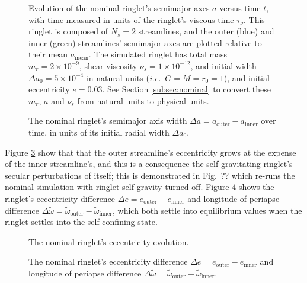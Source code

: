 \documentclass[preprint]{aastex62}
\begin{document}
\begin{figure}
\caption{Evolution of the nominal ringlet's semimajor axes $a$ versus time $t$, with time measured
in units of the ringlet's viscous time $\tau_\nu$. This ringlet is composed of $N_s=2$ streamlines,
and the outer (blue) and inner (green) streamlines' semimajor axes are plotted relative
to their mean $a_{\text{mean}}$. 
The simulated ringlet has total mass $m_r=2\times10^{-9}$, shear viscosity $\nu_s=1\times10^{-12}$,
and initial width $\Delta a_0 = 5\times10^{-4}$ in natural units ({\it i.e.}\ $G=M=r_0=1$),
and initial eccentricity $e=0.03$. See Section \ref{subsec:nominal} to convert
these $m_r$, $a$ and $\nu_s$ from natural units to physical units.
\label{fig:a_nominal}}
\end{figure}

\begin{figure}
\caption{
\label{fig:da_nominal}
The nominal ringlet's semimajor axis width $\Delta a = a_{\text{outer}} - a_{\text{inner}}$ over time, 
in units of its initial radial width $\Delta a_0$.}
\end{figure}

Figure \ref{fig:e_nominal} show that that the outer streamline's eccentricity grows at the
expense of the inner streamline's, and this is a consequence the self-gravitating ringlet's
secular perturbations of itself; this is demonstrated in Fig.\ ?? which re-runs the nominal
simulation with ringlet self-gravity turned off.  Figure \ref{fig:de_nominal} shows
the ringlet's eccentricity difference $\Delta e = e_{\text{outer}} - e_{\text{inner}}$
and longitude of periapse difference
$\Delta\tilde{\omega} = \tilde{\omega}_{\text{outer}} - \tilde{\omega}_{\text{inner}}$,
which both settle into equilibrium values when the ringlet settles into the self-confining
state.

\begin{figure}
\caption{
\label{fig:e_nominal}
The nominal ringlet's eccentricity evolution.}
\end{figure}

\begin{figure}
\caption{
\label{fig:de_nominal}
The nominal ringlet's eccentricity difference $\Delta e = e_{\text{outer}} - e_{\text{inner}}$
and longitude of periapse difference
$\Delta\tilde{\omega} = \tilde{\omega}_{\text{outer}} - \tilde{\omega}_{\text{inner}}$.}
\end{figure}
\end{document}

